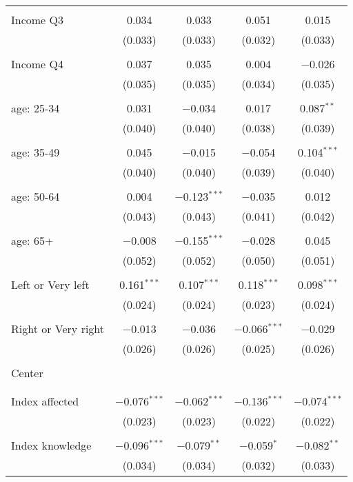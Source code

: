 \begin{tabular}{@{\extracolsep{5pt}}lcccc}
  & & & & \\ 
 Income Q3 & 0.034 & 0.033 & 0.051 & 0.015 \\ 
  & (0.033) & (0.033) & (0.032) & (0.033) \\ 
  & & & & \\ 
 Income Q4 & 0.037 & 0.035 & 0.004 & $-$0.026 \\ 
  & (0.035) & (0.035) & (0.034) & (0.035) \\ 
  & & & & \\ 
 age: 25-34 & 0.031 & $-$0.034 & 0.017 & 0.087$^{**}$ \\ 
  & (0.040) & (0.040) & (0.038) & (0.039) \\ 
  & & & & \\ 
 age: 35-49 & 0.045 & $-$0.015 & $-$0.054 & 0.104$^{***}$ \\ 
  & (0.040) & (0.040) & (0.039) & (0.040) \\ 
  & & & & \\ 
 age: 50-64 & 0.004 & $-$0.123$^{***}$ & $-$0.035 & 0.012 \\ 
  & (0.043) & (0.043) & (0.041) & (0.042) \\ 
  & & & & \\ 
 age: 65+ & $-$0.008 & $-$0.155$^{***}$ & $-$0.028 & 0.045 \\ 
  & (0.052) & (0.052) & (0.050) & (0.051) \\ 
  & & & & \\ 
 Left or Very left & 0.161$^{***}$ & 0.107$^{***}$ & 0.118$^{***}$ & 0.098$^{***}$ \\ 
  & (0.024) & (0.024) & (0.023) & (0.024) \\ 
  & & & & \\ 
 Right or Very right & $-$0.013 & $-$0.036 & $-$0.066$^{***}$ & $-$0.029 \\ 
  & (0.026) & (0.026) & (0.025) & (0.026) \\ 
  & & & & \\ 
 Center &  &  &  &  \\ 
  &  &  &  &  \\ 
  & & & & \\ 
 Index affected & $-$0.076$^{***}$ & $-$0.062$^{***}$ & $-$0.136$^{***}$ & $-$0.074$^{***}$ \\ 
  & (0.023) & (0.023) & (0.022) & (0.022) \\ 
  & & & & \\ 
 Index knowledge & $-$0.096$^{***}$ & $-$0.079$^{**}$ & $-$0.059$^{*}$ & $-$0.082$^{**}$ \\ 
  & (0.034) & (0.034) & (0.032) & (0.033) \\ 

\end{tabular}
